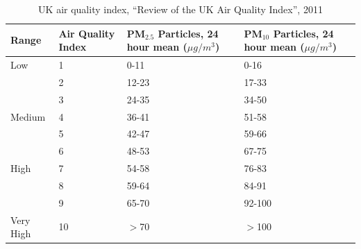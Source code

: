 \documentclass[12pt,oneside]{book} %
\begin{document}
\begin{table}[H]
    \centering
    \caption{UK air quality index, ``Review of the UK Air Quality Index'', 2011}
    \begin{tabular}{|p{2cm}|p{2cm}|p{}|p{}|}
        \hline
        \textbf{Range} & \textbf{Air Quality Index} & \textbf{PM\(_{2.5}\) Particles, 24 hour mean (\(\mu g/m^3\))} & \textbf{PM\(_{10}\) Particles, 24 hour mean (\(\mu g/m^3\))} \\ \hline
        Low            & 1                          & 0-11                                                          & 0-16                                                         \\
                       & 2                          & 12-23                                                         & 17-33                                                        \\
                       & 3                          & 24-35                                                         & 34-50                                                        \\ \hline
        Medium         & 4                          & 36-41                                                         & 51-58                                                        \\
                       & 5                          & 42-47                                                         & 59-66                                                        \\
                       & 6                          & 48-53                                                         & 67-75                                                        \\ \hline
        High           & 7                          & 54-58                                                         & 76-83                                                        \\
                       & 8                          & 59-64                                                         & 84-91                                                        \\
                       & 9                          & 65-70                                                         & 92-100                                                       \\ \hline
        Very High      & 10                         & $>$70                                                         & $>$100                                                       \\ \hline
    \end{tabular}
    \label{tab:uk_aqi}
\end{table}
\end{document}
